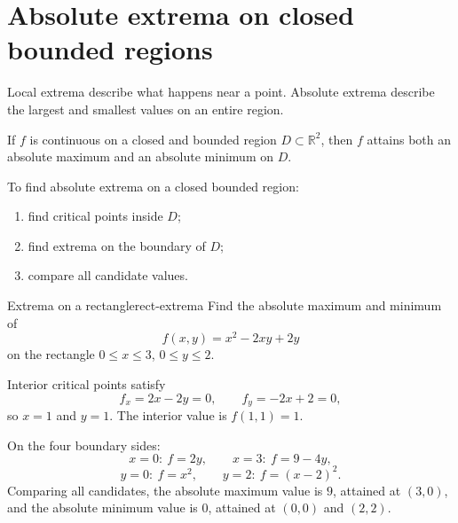\documentclass[11pt]{article}
\newcommand{\R}{\mathbb R}
\begin{document}
\section{Absolute extrema on closed bounded regions}

Local extrema describe what happens near a point. Absolute extrema describe the largest and smallest values on an entire region.

\begin{notebox}
If $f$ is continuous on a closed and bounded region $D\subset \R^2$, then $f$ attains both an absolute maximum and an absolute minimum on $D$.
\end{notebox}

To find absolute extrema on a closed bounded region:
\begin{enumerate}
  \item find critical points inside $D$;
  \item find extrema on the boundary of $D$;
  \item compare all candidate values.
\end{enumerate}

\begin{workedexample}{Extrema on a rectangle}{rect-extrema}
Find the absolute maximum and minimum of
\[
f(x,y)=x^2-2xy+2y
\]
on the rectangle $0\le x\le 3$, $0\le y\le 2$.

Interior critical points satisfy
\[
f_x=2x-2y=0,\qquad f_y=-2x+2=0,
\]
so $x=1$ and $y=1$. The interior value is $f(1,1)=1$.

On the four boundary sides:
\[
x=0:\ f=2y,
\qquad
x=3:\ f=9-4y,
\]
\[
y=0:\ f=x^2,
\qquad
y=2:\ f=(x-2)^2.
\]
Comparing all candidates, the absolute maximum value is $9$, attained at $(3,0)$, and the absolute minimum value is $0$, attained at $(0,0)$ and $(2,2)$.
\end{workedexample}
\end{document}
